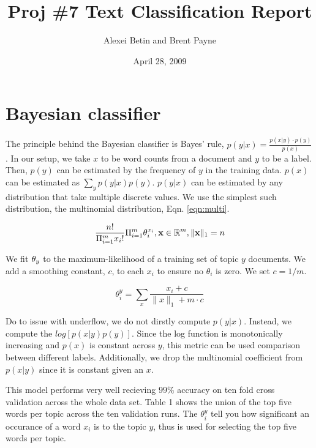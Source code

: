 \documentclass[fullpage]{article}
\title{Proj \#7 Text Classification Report}
\author{Alexei Betin and Brent Payne}
\date{April 28, 2009}
\begin{document}
\maketitle

\section{Bayesian classifier}
The principle behind the Bayesian classifier is Bayes' rule, $p(y|x) = \frac{p(x|y) \cdot p(y)}{p(x)}$ . In our setup, we take $x$ to be word counts from a document and $y$ to be a label.  Then, $p(y)$ can be estimated by the frequency of $y$ in the training data. $p(x)$ can be estimated as $\sum_{y} p(y|x)p(y)$. $p(y|x)$ can be estimated by any distribution that take multiple discrete values.  We use the simplest such distribution, the multinomial distribution, Eqn. \ref{eqn:multi}.

\begin{center}
\begin{equation}
\frac{n!}{\Pi_{i=1}^m x_i!} \Pi_{i=1}^m \theta_i^{x_i}, {\bf x} \in \mathbb{R}^m, \|{\bf x}\|_1 = n
\end{equation}
\label{eqn:multi}
\end{center}

We fit ${\bf\theta}_y$ to the maximum-likelihood of a training set of topic $y$ documents.  We add a smoothing constant, $c$, to each $x_i$ to ensure no $\theta_i$ is zero.  We set $c = 1 / m$.

\begin{center}
\begin{equation}
\theta_i^y = \sum_{x} \frac{ x_i +c}{ \|x\|_1+m\cdot c} 
\end{equation}
\label{eqn:theta}
\end{center}

Do to issue with underflow, we do not dirstly compute $p(y|x)$.  Instead, we compute the $log[ p(x|y) p(y) ]$.  Since the log function is monotonically increasing and $p(x)$ is constant across $y$, this metric can be used comparison between different labels.  Additionally, we drop the multinomial coefficient from $p(x|y)$ since it is constant given an $x$.

This model performs very well recieving $99\%$ accuracy on ten fold cross validation across the whole data set.  Table 1 shows the union of the top five words per topic across the ten validation runs.  The $\theta_i^y$ tell you how significant an occurance of a word $x_i$ is to the topic $y$, thus is used for selecting the top five words per topic.
\end{document}
